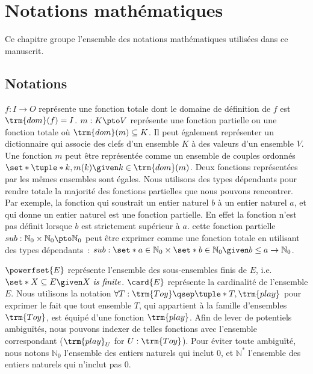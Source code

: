 \chapter{Notations mathématiques}
\label{ch:math-notations}

\minitoc
\bigskip

Ce chapitre groupe l'ensemble des notations mathématiques utilisées dans ce manuscrit.

\section{Notations}

$f: I \to O$ représente une fonction totale dont le domaine de définition de $f$ est $\trm{dom}(f) = I$.
$m: K \pto V$ représente une fonction partielle ou une fonction totale où $\trm{dom}(m) \subseteq K$.
Il peut également représenter un dictionnaire qui associe des clefs d'un ensemble $K$ à des valeurs d'un ensemble $V$.
Une fonction $m$ peut être représentée comme un ensemble de couples ordonnés $\set*{\tuple*{k, m(k)} \given k \in \trm{dom}(m)}$.
Deux fonctions représentées par les mêmes ensembles sont égales.
Nous utilisons des types dépendants pour rendre totale la majorité des fonctions partielles que nous pouvons rencontrer.
Par exemple, la fonction qui soustrait un entier naturel $b$ à un entier naturel $a$, et qui donne un entier naturel est une fonction partielle.
En effet la fonction n'est pas définit lorsque $b$ est strictement supérieur à $a$.
cette fonction partielle $sub: \mathbb{N}_0 \times \mathbb{N}_0 \pto \mathbb{N}_0$ peut être exprimer comme une fonction totale en utilisant des types dépendants~: $sub: \set*{a \in \mathbb{N}}_0 \times \set*{b \in \mathbb{N}_0 \given b \leq a} \to \mathbb{N}_0$.

$\powerfset{E}$ représente l'ensemble des sous-ensembles finis de $E$, i.e. $\set*{X \subseteq E \given X\ \textit{is finite}}$.
$\card{E}$ représente la cardinalité de l'ensemble $E$.
Nous utilisons la notation $\forall T : \trm{Toy} \qsep \tuple*{T, \trm{play}}$ pour exprimer le fait que tout ensemble $T$, qui appartient à la famille d'ensembles $\trm{Toy}$, est équipé d'une fonction $\trm{play}$.
Afin de lever de potentiels ambiguïtés, nous pouvons indexer de telles fonctions avec l'ensemble correspondant ($\trm{play}_U$ for $U : \trm{Toy}$).
Pour éviter toute ambiguïté, nous notons $\mathbb{N}_0$ l'ensemble des entiers naturels qui inclut $0$, et $\mathbb{N}^*$ l'ensemble des entiers naturels qui n'inclut pas $0$.


